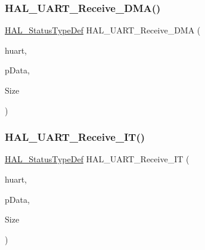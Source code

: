 \subsubsection{\texorpdfstring{H\+A\+L\+\_\+\+U\+A\+R\+T\+\_\+\+Receive\+\_\+\+D\+M\+A()}{HAL\_UART\_Receive\_DMA()}}
{\footnotesize\ttfamily \hyperlink{stm32f4xx__hal__def_8h_a63c0679d1cb8b8c684fbb0632743478f}{H\+A\+L\+\_\+\+Status\+Type\+Def} H\+A\+L\+\_\+\+U\+A\+R\+T\+\_\+\+Receive\+\_\+\+D\+MA (\begin{DoxyParamCaption}\item[{\hyperlink{group___u_a_r_t___exported___types_ga7adf4f3e4c3ecde572be5925c915a967}{U\+A\+R\+T\+\_\+\+Handle\+Type\+Def} $\ast$}]{huart,  }\item[{uint8\+\_\+t $\ast$}]{p\+Data,  }\item[{uint16\+\_\+t}]{Size }\end{DoxyParamCaption})}

\mbox{\label{group___u_a_r_t___exported___functions___group2_gadc0c3ef2109881d011601f0d41e70e40}} 
\subsubsection{\texorpdfstring{H\+A\+L\+\_\+\+U\+A\+R\+T\+\_\+\+Receive\+\_\+\+I\+T()}{HAL\_UART\_Receive\_IT()}}
{\footnotesize\ttfamily \hyperlink{stm32f4xx__hal__def_8h_a63c0679d1cb8b8c684fbb0632743478f}{H\+A\+L\+\_\+\+Status\+Type\+Def} H\+A\+L\+\_\+\+U\+A\+R\+T\+\_\+\+Receive\+\_\+\+IT (\begin{DoxyParamCaption}\item[{\hyperlink{group___u_a_r_t___exported___types_ga7adf4f3e4c3ecde572be5925c915a967}{U\+A\+R\+T\+\_\+\+Handle\+Type\+Def} $\ast$}]{huart,  }\item[{uint8\+\_\+t $\ast$}]{p\+Data,  }\item[{uint16\+\_\+t}]{Size }\end{DoxyParamCaption})}

\mbox{\label{group___u_a_r_t___exported___functions___group2_gae494a9643f29b87d6d81e5264e60e57b}} 
